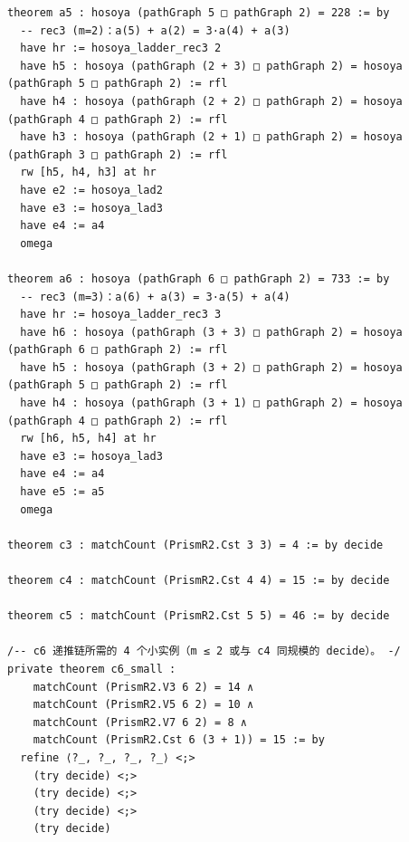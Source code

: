 \documentclass[11pt]{article}
\begin{document}
\begin{lstlisting}
theorem a5 : hosoya (pathGraph 5 □ pathGraph 2) = 228 := by
  -- rec3 (m=2)：a(5) + a(2) = 3·a(4) + a(3)
  have hr := hosoya_ladder_rec3 2
  have h5 : hosoya (pathGraph (2 + 3) □ pathGraph 2) = hosoya (pathGraph 5 □ pathGraph 2) := rfl
  have h4 : hosoya (pathGraph (2 + 2) □ pathGraph 2) = hosoya (pathGraph 4 □ pathGraph 2) := rfl
  have h3 : hosoya (pathGraph (2 + 1) □ pathGraph 2) = hosoya (pathGraph 3 □ pathGraph 2) := rfl
  rw [h5, h4, h3] at hr
  have e2 := hosoya_lad2
  have e3 := hosoya_lad3
  have e4 := a4
  omega

theorem a6 : hosoya (pathGraph 6 □ pathGraph 2) = 733 := by
  -- rec3 (m=3)：a(6) + a(3) = 3·a(5) + a(4)
  have hr := hosoya_ladder_rec3 3
  have h6 : hosoya (pathGraph (3 + 3) □ pathGraph 2) = hosoya (pathGraph 6 □ pathGraph 2) := rfl
  have h5 : hosoya (pathGraph (3 + 2) □ pathGraph 2) = hosoya (pathGraph 5 □ pathGraph 2) := rfl
  have h4 : hosoya (pathGraph (3 + 1) □ pathGraph 2) = hosoya (pathGraph 4 □ pathGraph 2) := rfl
  rw [h6, h5, h4] at hr
  have e3 := hosoya_lad3
  have e4 := a4
  have e5 := a5
  omega

theorem c3 : matchCount (PrismR2.Cst 3 3) = 4 := by decide

theorem c4 : matchCount (PrismR2.Cst 4 4) = 15 := by decide

theorem c5 : matchCount (PrismR2.Cst 5 5) = 46 := by decide

/-- c6 递推链所需的 4 个小实例（m ≤ 2 或与 c4 同规模的 decide）。 -/
private theorem c6_small :
    matchCount (PrismR2.V3 6 2) = 14 ∧
    matchCount (PrismR2.V5 6 2) = 10 ∧
    matchCount (PrismR2.V7 6 2) = 8 ∧
    matchCount (PrismR2.Cst 6 (3 + 1)) = 15 := by
  refine ⟨?_, ?_, ?_, ?_⟩ <;>
    (try decide) <;>
    (try decide) <;>
    (try decide) <;>
    (try decide)


\end{lstlisting}
\end{document}
